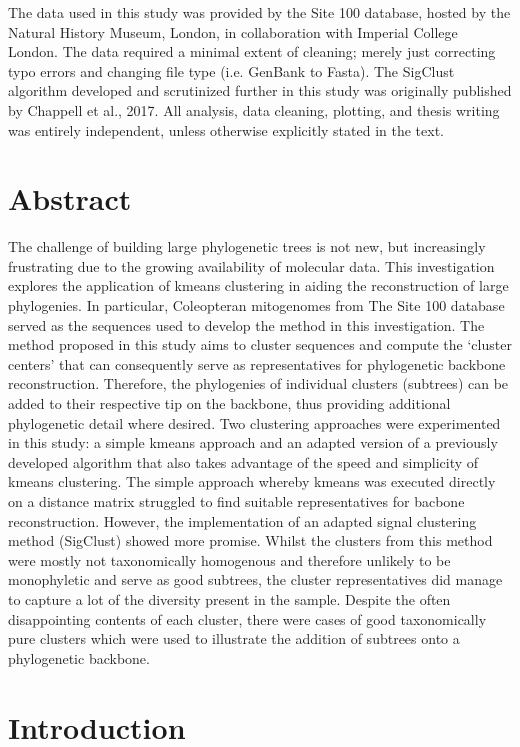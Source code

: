\documentclass[12pt]{article}
\begin{document}
The data used in this study was provided by the Site 100 database, hosted by the Natural History Museum, London, in collaboration with Imperial College London. The data required a minimal extent of cleaning; merely just correcting typo errors and changing file type (i.e. GenBank to Fasta). The SigClust algorithm developed and scrutinized further in this study was originally published by Chappell et al., 2017. All analysis, data cleaning, plotting, and thesis writing was entirely independent, unless otherwise explicitly stated in the text. 

\newpage
\tableofcontents

  \newpage
  \section{Abstract}
  The challenge of building large phylogenetic trees is not new, but increasingly frustrating due to the growing availability of molecular data. This investigation explores the application of kmeans clustering in aiding the reconstruction of large phylogenies. In particular, Coleopteran mitogenomes from The Site 100 database served as the sequences used to develop the method in this investigation. The method proposed in this study aims to cluster sequences and compute the `cluster centers' that can consequently serve as representatives for phylogenetic backbone reconstruction. Therefore, the phylogenies of individual clusters (subtrees) can be added to their respective tip on the backbone, thus providing additional phylogenetic detail where desired. Two clustering approaches were experimented in this study: a simple kmeans approach and an adapted version of a previously developed algorithm that also takes advantage of the speed and simplicity of kmeans clustering. The simple approach whereby kmeans was executed directly on a distance matrix struggled to find suitable representatives for bacbone reconstruction. However, the implementation of an adapted signal clustering method (SigClust) showed more promise. Whilst the clusters from this method  were mostly not taxonomically homogenous and therefore unlikely to be monophyletic and serve as good subtrees, the cluster representatives did manage to capture a lot of the diversity present in the sample. Despite the often disappointing contents of each cluster, there were cases of good taxonomically pure clusters which were used to illustrate the addition of subtrees onto a phylogenetic backbone. 
  
  \newpage
  \section{Introduction}
    
\end{document}
